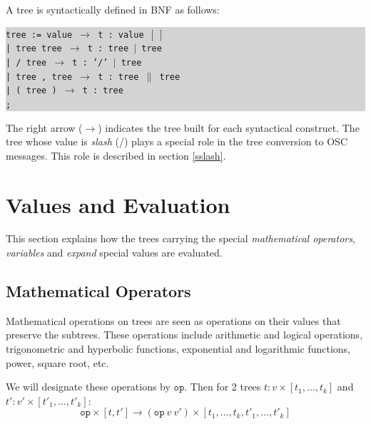 \documentclass[runningheads]{llncs}
\newcommand{\code}	[2][0.9]	{\vspace{0mm}\begin{center}\colorbox{lightgrey}{
							\begin{minipage}[t]{#1\columnwidth} 
							{\small \texttt{#2}}
							\end{minipage}}\end{center}}
\newcommand{\llist}	[1]		{\ensuremath{[#1_1,...,#1_k]}}
\newcommand{\seq}		{\ensuremath{|}}
\newcommand{\paral}		{\ensuremath{\parallel}}
\newcommand{\binop}		{\ensuremath{\texttt{op}}}
\newcommand{\etc}		{\ensuremath{\text{…}}}
\newcommand{\emptyf}	{\ensuremath{[\ ]}}
\newcommand{\ula}		{\hspace*{8mm}}
\begin{document}
A tree is syntactically defined in BNF as follows:
\code{tree := value      \hspace*{8mm} $\to$ t : value \emptyf \\
\ula | tree tree         \hspace*{4mm} $\to$ t : tree \seq\ tree \\
\ula | / tree            \hspace*{9.7mm} $\to$ t : '/' \seq\ tree\\
\ula | tree , tree       \hspace*{0mm}  $\to$ t : tree \paral\ tree \\
\ula | ( tree )          \hspace*{6mm} $\to$ t : tree \\
\ula ;
}
The right arrow ($\to$) indicates the tree built for each syntactical construct. 
The tree whose value is \emph{slash} (/) plays a special role in the tree conversion to OSC messages. This role is described in section \ref{sslash}.


\section{Values and Evaluation}\label{sec:valeurs}

This section explains how the trees carrying the special \emph{mathematical operators}, \emph{variables} and \emph{expand} special values are evaluated.

\subsection{Mathematical Operators}

Mathematical operations on trees are seen as operations on their values that preserve the subtrees. These operations include arithmetic and logical operations, trigonometric and hyperbolic functions, exponential and logarithmic functions, power, square root, etc.

We will designate these operations by \binop. Then for 2 trees $t : v \times \llist{t}$ and $t' : v' \times \llist{t'}$:
\[
	\binop \times [ t, t']  \to  (\binop\ v\ v') \times [ t_1,\etc,t_k,t'_1,\etc,t'_k ]
\]

\end{document}
